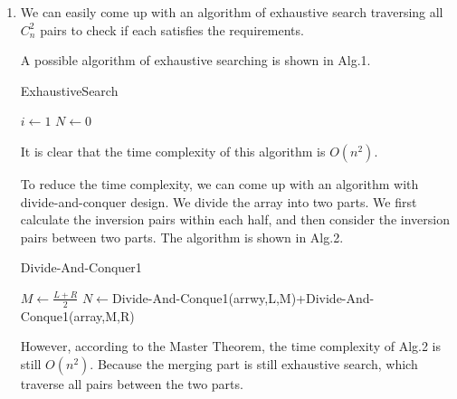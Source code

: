 \documentclass[12pt,a4paper]{article}
\makeatletter
\newtheorem*{solution}{Solution}
\theoremstyle{definition}
\renewenvironment{solution}[1][Solution] {\par\pushQED{\qed}\normalfont\topsep6\p@\@plus6\p@\relax\trivlist\item[\hskip\labelsep\bfseries#1\@addpunct{.}]\ignorespaces}{\popQED\endtrivlist\@endpefalse} \makeatother
\makeatother
\begin{document}
\begin{enumerate}
\begin{enumerate}
\begin{solution}
        We can easily come up with an algorithm of exhaustive search traversing all $C_n^2$ pairs to check if each satisfies the requirements.
        
        A possible algorithm of exhaustive searching is shown in Alg.1.
        
        
        \begin{minipage}[t]{0.8\textwidth}
		\begin{algorithm}[H]
			\BlankLine
			\caption{ExhaustiveSearch}
			\label{Alg-selectionsort}
			\BlankLine
			$i\leftarrow 1$\;
			$N\leftarrow0$\;
			
		\end{algorithm}
		\end{minipage}
	
	It is clear that the time complexity of this algorithm is $O(n^2)$.
	
	To reduce the time complexity, we can come up with an algorithm with divide-and-conquer design. We divide the array into two parts. We first calculate the inversion pairs within each half, and then consider the inversion pairs between two parts. The algorithm is shown in Alg.2.
	
	 \begin{minipage}[t]{0.9\textwidth}
		\begin{algorithm}[H]
			\BlankLine
			\caption{Divide-And-Conquer1}
			\label{Alg-selectionsort}
			\BlankLine
			$M\leftarrow\frac{L+R}{2}$\;
			$N\leftarrow$Divide-And-Conque1(arrwy,L,M)+Divide-And-Conque1(array,M,R)\;
		
			
		\end{algorithm}
	\end{minipage}
	However, according to the Master Theorem, the time complexity of Alg.2 is still $O(n^2)$. Because the merging part is still exhaustive search, which traverse all pairs between the two parts.
	

\end{solution}
\end{enumerate}
\end{enumerate}
\end{document}

